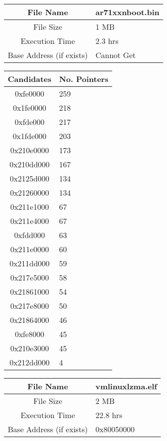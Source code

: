 \documentclass[letterpaper,twocolumn,10pt]{article}
\begin{document}
\begin{center}
    \begin{tabular}{| c | p{3cm} |}
        \hline
        File Name & ar71xxnboot.bin\\ \hline
        File Size & 1 MB \\ \hline
        Execution Time & 2.3 hrs \\ \hline
        Base Address (if exists) & Cannot Get\\ \hline
    \end{tabular}
    
    \begin{tabular}{| c | p{3cm} |}
        \hline
        Candidates & No. Pointers \\ \hline
        0xfe0000 & 259 \\ \hline
        0x1fe0000 & 218 \\ \hline
        0xfde000 & 217 \\ \hline
        0x1fde000 & 203\\ \hline
        0x210e0000 & 173\\ \hline
        0x210dd000 & 167\\ \hline
        0x2125d000 & 134\\ \hline
        0x21260000 & 134\\ \hline
        0x211e1000 & 67\\ \hline
        0x211e4000 & 67\\ \hline
        0xfdd000 & 63\\ \hline
        0x211e0000 & 60\\ \hline
        0x211dd000 & 59\\ \hline
        0x217e5000 & 58\\ \hline
        0x21861000 & 54\\ \hline
        0x217e8000 & 50\\ \hline
        0x21864000 & 46\\ \hline
        0xfe8000 & 45\\ \hline
        0x210e3000 & 45\\ \hline
        0x212dd000 & 4\\ \hline
    \end{tabular}
        
    \begin{tabular}{| c | p{3cm} |}
        \hline
        File Name & vmlinuxlzma.elf\\ \hline
        File Size & 2 MB \\ \hline
        Execution Time & 22.8 hrs \\ \hline
        Base Address (if exists) & 0x80050000\\ \hline
    \end{tabular}
    

\end{center}
\end{document}

